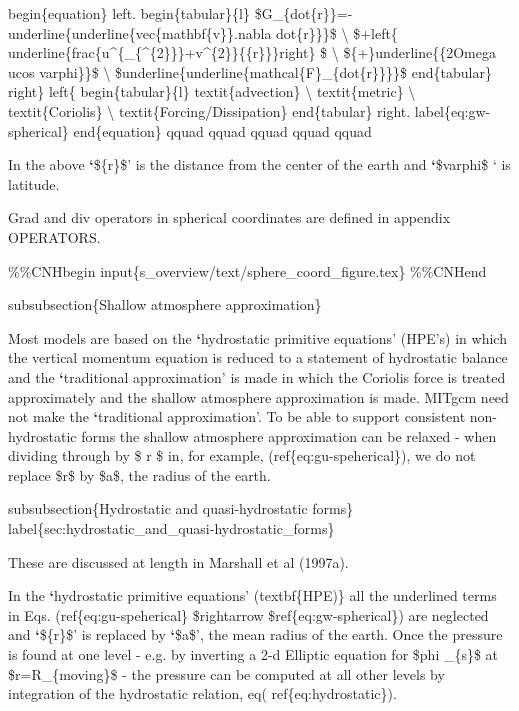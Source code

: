 \documentclass[letterpaper,10pt,english]{sphinxmanual}
\begin{document}
begin\{equation\}
left.
begin\{tabular\}\{l\}
\$G\_\{dot\{r\}\}=-underline\{underline\{vec\{mathbf\{v\}\}.nabla dot\{r\}\}\}\$ \textbackslash{}
\$+left\{ underline\{frac\{u\textasciicircum{}\{\_\{\textasciicircum{}\{2\}\}\}+v\textasciicircum{}\{2\}\}\{\{r\}\}\}right\} \$ \textbackslash{}
\$\{+\}underline\{\{2Omega ucos varphi\}\}\$ \textbackslash{}
\$underline\{underline\{mathcal\{F\}\_\{dot\{r\}\}\}\}\$
end\{tabular\}
right\} left\{
begin\{tabular\}\{l\}
textit\{advection\} \textbackslash{}
textit\{metric\} \textbackslash{}
textit\{Coriolis\} \textbackslash{}
textit\{Forcing/Dissipation\}
end\{tabular\}
right.  label\{eq:gw-spherical\}
end\{equation\}
qquad qquad qquad qquad qquad

In the above {\color{red}\bfseries{}{}`}\$\{r\}\$' is the distance from the center of the earth and {\color{red}\bfseries{}{}`}\$varphi\$
` is latitude.

Grad and div operators in spherical coordinates are defined in appendix
OPERATORS.

\%\%CNHbegin
input\{s\_overview/text/sphere\_coord\_figure.tex\}
\%\%CNHend

subsubsection\{Shallow atmosphere approximation\}

Most models are based on the {\color{red}\bfseries{}{}`}hydrostatic primitive equations' (HPE's)
in which the vertical momentum equation is reduced to a statement of
hydrostatic balance and the {\color{red}\bfseries{}{}`}traditional approximation' is made in
which the Coriolis force is treated approximately and the shallow
atmosphere approximation is made.  MITgcm need not make the
{\color{red}\bfseries{}{}`}traditional approximation'. To be able to support consistent
non-hydrostatic forms the shallow atmosphere approximation can be
relaxed - when dividing through by \$ r \$ in, for example,
(ref\{eq:gu-speherical\}), we do not replace \$r\$ by \$a\$, the radius of
the earth.

subsubsection\{Hydrostatic and quasi-hydrostatic forms\}
label\{sec:hydrostatic\_and\_quasi-hydrostatic\_forms\}

These are discussed at length in Marshall et al (1997a).

In the {\color{red}\bfseries{}{}`}hydrostatic primitive equations' (textbf\{HPE)\} all the underlined
terms in Eqs. (ref\{eq:gu-speherical\} \$rightarrow \$ref\{eq:gw-spherical\})
are neglected and {\color{red}\bfseries{}{}`}\$\{r\}\$' is replaced by {\color{red}\bfseries{}{}`}\$a\$', the mean radius of the
earth. Once the pressure is found at one level - e.g. by inverting a 2-d
Elliptic equation for \$phi \_\{s\}\$ at \$r=R\_\{moving\}\$ - the pressure can be
computed at all other levels by integration of the hydrostatic relation, eq(
ref\{eq:hydrostatic\}).
\end{document}
